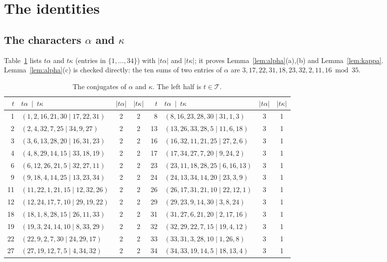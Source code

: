 \documentclass[11pt]{amsart}
\theoremstyle{definition}
\theoremstyle{remark}
\numberwithin{equation}{section}
\newcommand{\cT}{\mathcal{T}}
\begin{document}
\section{The identities}\label{app:ident}

\subsection{\texorpdfstring{The characters $\alpha$ and $\kappa$}{The characters alpha and kappa}}
Table~\ref{tab:alphakappa} lists $t\alpha$ and $t\kappa$ (entries in $\{1,\dots,34\}$) with $|t\alpha|$ and $|t\kappa|$; it proves Lemma~\ref{lem:alpha}(a),(b) and Lemma~\ref{lem:kappa}. Lemma~\ref{lem:alpha}(c) is checked directly: the ten sums of two entries of $\alpha$ are $3,17,22,31,18,23,32,2,11,16\bmod35$.

\begin{table}[ht]
\centering\small
\begin{tabular}{rlcc@{\qquad}rlcc}
\toprule
$t$ & $t\alpha\ \mid\ t\kappa$ & $|t\alpha|$ & $|t\kappa|$ & $t$ & $t\alpha\ \mid\ t\kappa$ & $|t\alpha|$ & $|t\kappa|$\\
\midrule
1 & $(1,2,16,21,30\mid17,22,31)$ & 2 & 2 & 8 & $(8,16,23,28,30\mid31,1,3)$ & 3 & 1\\
2 & $(2,4,32,7,25\mid34,9,27)$ & 2 & 2 & 13 & $(13,26,33,28,5\mid11,6,18)$ & 3 & 1\\
3 & $(3,6,13,28,20\mid16,31,23)$ & 2 & 2 & 16 & $(16,32,11,21,25\mid27,2,6)$ & 3 & 1\\
4 & $(4,8,29,14,15\mid33,18,19)$ & 2 & 2 & 17 & $(17,34,27,7,20\mid9,24,2)$ & 3 & 1\\
6 & $(6,12,26,21,5\mid32,27,11)$ & 2 & 2 & 23 & $(23,11,18,28,25\mid6,16,13)$ & 3 & 1\\
9 & $(9,18,4,14,25\mid13,23,34)$ & 2 & 2 & 24 & $(24,13,34,14,20\mid23,3,9)$ & 3 & 1\\
11 & $(11,22,1,21,15\mid12,32,26)$ & 2 & 2 & 26 & $(26,17,31,21,10\mid22,12,1)$ & 3 & 1\\
12 & $(12,24,17,7,10\mid29,19,22)$ & 2 & 2 & 29 & $(29,23,9,14,30\mid3,8,24)$ & 3 & 1\\
18 & $(18,1,8,28,15\mid26,11,33)$ & 2 & 2 & 31 & $(31,27,6,21,20\mid2,17,16)$ & 3 & 1\\
19 & $(19,3,24,14,10\mid8,33,29)$ & 2 & 2 & 32 & $(32,29,22,7,15\mid19,4,12)$ & 3 & 1\\
22 & $(22,9,2,7,30\mid24,29,17)$ & 2 & 2 & 33 & $(33,31,3,28,10\mid1,26,8)$ & 3 & 1\\
27 & $(27,19,12,7,5\mid4,34,32)$ & 2 & 2 & 34 & $(34,33,19,14,5\mid18,13,4)$ & 3 & 1\\
\bottomrule
\end{tabular}
\caption{The conjugates of $\alpha$ and $\kappa$. The left half is $t\in\cT$.}
\label{tab:alphakappa}
\end{table}
\end{document}
